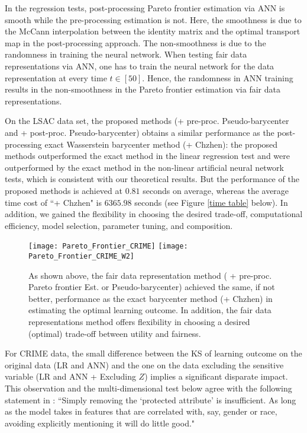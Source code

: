 \documentclass[twoside,11pt]{article}
\begin{document}
In the regression tests, post-processing Pareto frontier estimation via ANN is smooth while the pre-processing estimation is not. Here, the smoothness is due to the McCann interpolation between the identity matrix and the optimal transport map in the post-processing approach. The non-smoothness is due to the randomness in training the neural network. When testing fair data representations via ANN, one has to train the neural network for the data representation at every time $t \in [50]$. Hence, the randomness in ANN training results in the non-smoothness in the Pareto frontier estimation via fair data representations.

On the LSAC data set, the proposed methods (+ pre-proc. Pseudo-barycenter and + post-proc. Pseudo-barycenter) obtains a similar performance as the post-processing exact Wasserstein barycenter method (+ Chzhen): the proposed methods outperformed the exact method in the linear regression test and were outperformed by the exact method in the non-linear artificial neural network tests, which is consistent with our theoretical results. But the performance of the proposed methods is achieved at $0.81$ seconds on average, whereas the average time cost of ``+ Chzhen" is $6365.98$ seconds (see Figure \ref{time table} below). In addition, we gained the flexibility in choosing the desired trade-off, computational efficiency, model selection, parameter tuning, and composition.

\begin{figure}[H]
\centering
\texttt{[image: Pareto\_Frontier\_CRIME]}\hfill
\texttt{[image: Pareto\_Frontier\_CRIME\_W2]}\hfill
\caption{As shown above, the fair data representation method ( + pre-proc. Pareto frontier Est. or Pseudo-barycenter) achieved the same, if not better, performance as the exact barycenter method (+ Chzhen) in estimating the optimal learning outcome. In addition, the fair data representations method offers flexibility in choosing a desired (optimal) trade-off between utility and fairness.}
\label{univariate comparison CRIME}
\end{figure}

For CRIME data, the small difference between the KS of learning outcome on the original data (LR and ANN) and the one on the data excluding the sensitive variable (LR and ANN + Excluding $Z$) implies a significant disparate impact. This observation and the multi-dimensional test below agree with the following statement in \cite{christian2020alignment}: ``Simply removing the `protected attribute' is insufficient. As long as the model takes in features that are correlated with, say, gender or race, avoiding explicitly mentioning it will do little good."
\end{document}
